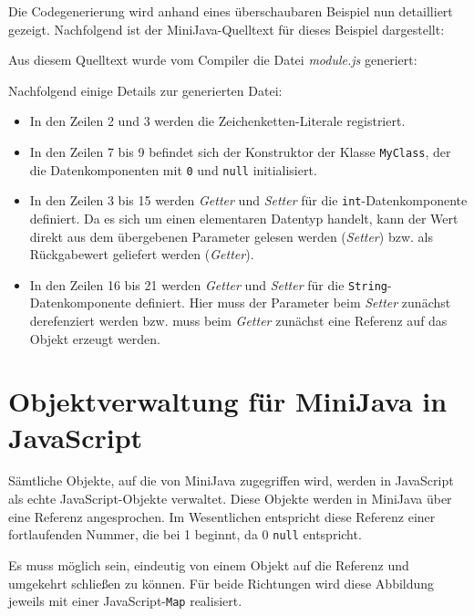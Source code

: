 Die Codegenerierung wird anhand eines überschaubaren Beispiel nun detailliert gezeigt. Nachfolgend ist der MiniJava-Quelltext für dieses Beispiel dargestellt:



Aus diesem Quelltext wurde vom Compiler die Datei \emph{module.js} generiert:



Nachfolgend einige Details zur generierten Datei:

\begin{itemize}
    \item In den Zeilen 2 und 3 werden die Zeichenketten-Literale registriert. 
    \item In den Zeilen 7 bis 9 befindet sich der Konstruktor der Klasse \lstinline{MyClass}, der die Datenkomponenten mit \lstinline{0} und \lstinline{null} initialisiert.
    \item In den Zeilen 3 bis 15 werden \emph{Getter} und \emph{Setter} für die \lstinline{int}-Datenkomponente definiert. Da es sich um einen elementaren Datentyp handelt, kann der Wert direkt aus dem übergebenen Parameter gelesen werden (\emph{Setter}) bzw. als Rückgabewert geliefert werden (\emph{Getter}).
    \item In den Zeilen 16 bis 21 werden \emph{Getter} und \emph{Setter} für die \lstinline{String}-Datenkomponente definiert. Hier muss der Parameter beim \emph{Setter} zunächst derefenziert werden bzw. muss beim \emph{Getter} zunächst eine Referenz auf das Objekt erzeugt werden.
\end{itemize}

\section{Objektverwaltung für MiniJava in JavaScript}

Sämtliche Objekte, auf die von MiniJava zugegriffen wird, werden in JavaScript als echte JavaScript-Objekte verwaltet. Diese Objekte werden in MiniJava über eine Referenz angesprochen. Im Wesentlichen entspricht diese Referenz einer fortlaufenden Nummer, die bei 1 beginnt, da 0 \lstinline{null} entspricht.

Es muss möglich sein, eindeutig von einem Objekt auf die Referenz und umgekehrt schließen zu können. Für beide Richtungen wird diese Abbildung jeweils mit einer Java\-Script-\lstinline{Map} realisiert.

